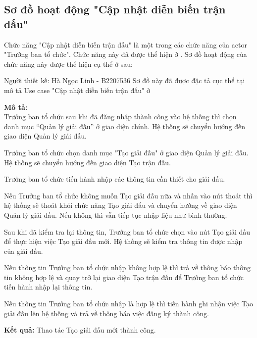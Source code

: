 \subsection{Sơ đồ hoạt động "Cập nhật diễn biến trận đấu"}
\setcounter{figure}{0}

Chức năng "Cập nhật diễn biến trận đấu" là một trong các chức năng của actor "Trưởng ban tổ chức".
Chức năng này đã được thể hiện ở \myref{}.
Sơ đồ hoạt động của chức năng này được thể hiện cụ thể ở \myref{} sau:

Người thiết kế: Hà Ngọc Linh - B2207536
Sơ đồ này đã được đặc tả cục thể tại mô tả Use case "Cập nhật diễn biến trận đấu" ở \myreftb{}

\noindent
\textbf{Mô tả:}\\
Trưởng ban tổ chức sau khi đã đăng nhập thành công vào hệ thống thì chọn danh mục “Quản lý giải đấu” ở giao diện chính. Hệ thống sẽ chuyển hướng đến giao diện Quản lý giải đấu.\par
Trưởng ban tổ chức chọn danh mục "Tạo giải đấu" ở giao diện Quản lý giải đấu. Hệ thống sẽ chuyển hướng đến giao diện Tạo trận đấu.\par
Trưởng ban tổ chức tiến hành nhập các thông tin cần thiết cho giải đấu.\par
Nếu Trưởng ban tổ chức không muốn Tạo giải đấu nữa và nhấn vào nút thoát thì hệ thống sẽ thoát khỏi chức năng Tạo giải đấu và chuyển hướng về giao diện Quản lý giải đấu. Nếu không thì vẫn tiếp tục nhập liệu như bình thường.\par
Sau khi đã kiểm tra lại thông tin, Trưởng ban tổ chức chọn vào nút Tạo giải đấu để thực hiện việc Tạo giải đấu mới. Hệ thống sẽ kiểm tra thông tin được nhập của giải đấu.\par
Nếu thông tin Trưởng ban tổ chức nhập không hợp lệ thì trả về thông báo thông tin không hợp lệ và quay trở lại giao diện Tạo trận đấu để Trưởng ban tổ chức tiến hành nhập lại thông tin.\par
Nếu thông tin Trưởng ban tổ chức nhập là hợp lệ thì tiến hành ghi nhận việc Tạo giải đấu lên hệ thống và trả về thông báo việc đăng ký thành công.

\noindent
\textbf{Kết quả:} Thao tác Tạo giải đấu mới thành công.



